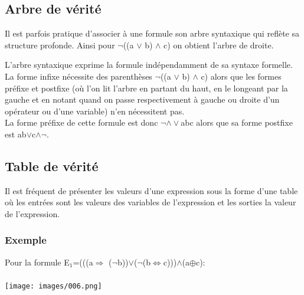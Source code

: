 \documentclass[a4paper,10pt]{book}
\begin{document}
\subsection{Arbre de vérité}
Il est parfois pratique d’associer à une formule son arbre syntaxique qui reflète sa structure profonde. Ainsi pour $\neg$((a $\vee$ b) $\wedge$ c) on obtient l'arbre de droite.\bigskip

L'arbre syntaxique exprime la formule indépendamment de sa syntaxe formelle. La forme infixe nécessite des parenthèses $\neg$((a $\vee$ b) $\wedge$ c) alors que les formes préfixe et postfixe (où l'on lit l'arbre en partant du haut, en le longeant par la gauche et en notant quand on passe respectivement à gauche ou droite d'un opérateur ou d'une variable) n'en nécessitent pas.\\

La forme préfixe de cette formule est donc $\neg\wedge\vee$abc alors que sa forme postfixe est ab$\vee$c$\wedge\neg$.

\subsection{Table de vérité}
Il est fréquent de présenter les valeurs d’une expression sous la forme d’une table où les entrées sont les valeurs des variables de l’expression et les sorties la valeur de l’expression.

\subsubsection{Exemple}
Pour la formule E$_{1}$=(((a$\Rightarrow$ ($\neg$b))$\vee$($\neg$(b$\Leftrightarrow$c)))$\wedge$(a$\oplus$c):\\\\
\texttt{[image: images/006.png]}
\end{document}
